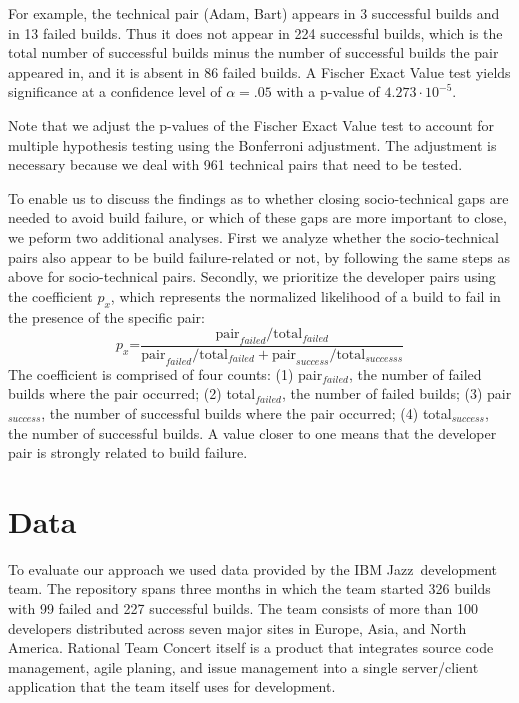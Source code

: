 \documentclass[conference]{IEEEtran}
\begin{document}
For example, 
the technical pair (Adam, Bart) appears in 3 successful builds and in
13 failed builds. Thus it does not appear in 224 successful builds, which is the total number of successful builds minus the number of successful builds the pair appeared in, and it is absent in 86 failed builds.
A Fischer Exact Value test yields significance at a confidence level of $\alpha = .05$ with a p-value of $4.273\cdot10^{-5}$.

Note that we adjust the p-values of the Fischer Exact Value test to account for multiple hypothesis testing using the Bonferroni adjustment.
The adjustment is necessary because we deal with 961 technical pairs that need to be tested. 

To enable us to discuss the findings as to whether closing socio-technical gaps
are needed to avoid build failure, or which of these gaps are more important to
close, we peform two additional analyses. 
First we analyze whether the
socio-technical pairs also appear to be build failure-related or not, by
following the same steps as above for socio-technical pairs. 
Secondly, we prioritize the developer pairs using the coefficient $p_x$,
which represents the normalized likelihood of a build
to fail in the presence of the specific pair:
$$
p_x\text{=}\frac{ \text{pair}_{failed} / \text{total}_{failed} }
                     { \text{pair}_{failed} / \text{total}_{failed} + \text{pair}_{success} / \text{total}_{successs}}
$$
The coefficient is comprised of four counts: (1) pair$_{failed}$, the number of failed builds where the pair occurred; (2) total$_{failed}$, the number of failed builds; (3) pair$_{success}$, the number of successful builds where the pair occurred; (4) total$_{success}$, the number of successful builds.
A value closer to one means that the developer pair is strongly related to build
failure. 

\section{Data}
To evaluate our approach we used data provided by the IBM Jazz\texttrademark\ development team.
The repository spans three months in which the team started 326 builds with 99 failed and 227 successful builds.
The team consists of more than 100 developers distributed across seven major sites in Europe, Asia, and North America.
Rational Team Concert itself is a product that integrates source code management, agile planing, and issue management into a single server/client application that the team itself uses for development.
\end{document}
